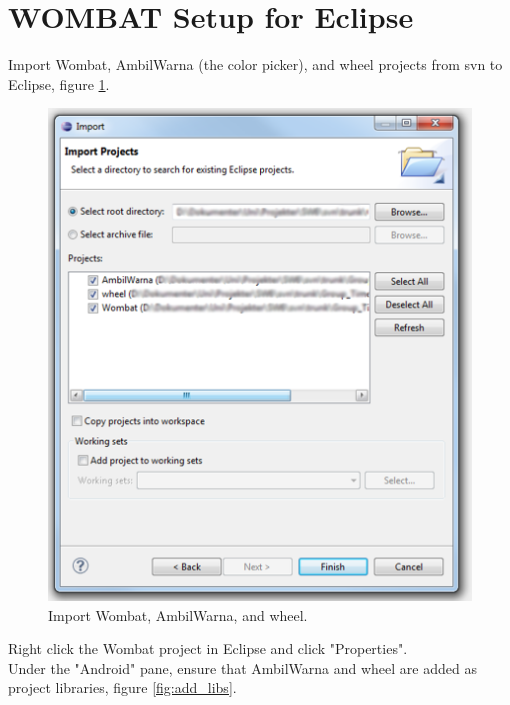 \section{WOMBAT Setup for Eclipse}
Import Wombat, AmbilWarna (the color picker), and wheel projects from svn to Eclipse, figure \ref{fig:import1}.

\begin{figure}[H]
	\centering
		\includegraphics[scale=0.2]{Images/how_to_wombat/import1.png}
	\caption{Import Wombat, AmbilWarna, and wheel.}
	\label{fig:import1}
\end{figure}

Right click the Wombat project in Eclipse and click "Properties".\\
Under the "Android" pane, ensure that AmbilWarna and wheel are added as project libraries, figure \ref{fig:add_libs}.

